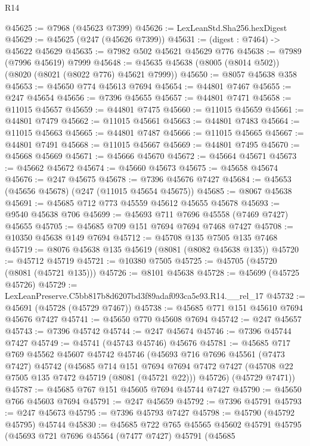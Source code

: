 \begin{lexlean}{R14}
\begin{coremodule}
@45625 := @7968 (@45623 @7399)
@45626 := LexLeanStd.Sha256.hexDigest
@45629 := @45625 (@247 (@45626 @7399))
@45631 := (digest : @7464) -> @45622 @45629
@45635 := @7982 @502 @45621 @45629 @776
@45638 := @7989 (@7996 @45619) @7999
@45648 := @45635 @45638 (@8005 (@8014 @502)) (@8020 (@8021 (@8022 @776) @45621 @7999))
@45650 := @8057 @45638 @358
@45653 := @45650 @774 @45613 @7694
@45654 := @44801 @7467
@45655 := @247 @45654
@45656 := @7396 @45655
@45657 := @44801 @7471
@45658 := @11015 @45657
@45659 := @44801 @7475
@45660 := @11015 @45659
@45661 := @44801 @7479
@45662 := @11015 @45661
@45663 := @44801 @7483
@45664 := @11015 @45663
@45665 := @44801 @7487
@45666 := @11015 @45665
@45667 := @44801 @7491
@45668 := @11015 @45667
@45669 := @44801 @7495
@45670 := @45668 @45669
@45671 := @45666 @45670
@45672 := @45664 @45671
@45673 := @45662 @45672
@45674 := @45660 @45673
@45675 := @45658 @45674
@45676 := @247 @45675
@45678 := @7396 @45676 @7427
@45684 := @45653 (@45656 @45678) (@247 (@11015 @45654 @45675))
@45685 := @8067 @45638
@45691 := @45685 @712 @773 @45559 @45612 @45655 @45678
@45693 := @9540 @45638 @706
@45699 := @45693 @711 @7696 @45558 (@7469 @7427) @45655
@45705 := @45685 @709 @151 @7694 @7694 @7468 @7427
@45708 := @10350 @45638 @149 @7694
@45712 := @45708 @135 @7505 @135 @7468
@45719 := @8076 @45638 @135 @45619 (@8081 (@8082 @45638 @135))
@45720 := @45712 @45719
@45721 := @10380 @7505
@45725 := @45705 (@45720 (@8081 (@45721 @135)))
@45726 := @8101 @45638
@45728 := @45699 (@45725 @45726)
@45729 := LexLeanPreserve.C5bb817b8d6207bd3f89adaf093ca5e93.R14.__rel_17
@45732 := @45691 (@45728 (@45729 @7467))
@45738 := @45685 @771 @151 @45610 @7694 @45676 @7427
@45741 := @45650 @770 @45608 @7694
@45742 := @247 @45657
@45743 := @7396 @45742
@45744 := @247 @45674
@45746 := @7396 @45744 @7427
@45749 := @45741 (@45743 @45746) @45676
@45781 := @45685
    @717
    @769
    @45562
    @45607
    @45742
    @45746
    (@45693
      @716
      @7696
      @45561
      (@7473 @7427)
      @45742
      (@45685
        @714
        @151
        @7694
        @7694
        @7472
        @7427
        (@45708 @22 @7505 @135 @7472 @45719 (@8081 (@45721 @22)))
        @45726)
      (@45729 @7471))
@45787 := @45685 @767 @151 @45605 @7694 @45744 @7427
@45790 := @45650 @766 @45603 @7694
@45791 := @247 @45659
@45792 := @7396 @45791
@45793 := @247 @45673
@45795 := @7396 @45793 @7427
@45798 := @45790 (@45792 @45795) @45744
@45830 := @45685
    @722
    @765
    @45565
    @45602
    @45791
    @45795
    (@45693
      @721
      @7696
      @45564
      (@7477 @7427)
      @45791
      (@45685

\end{coremodule}
\end{lexlean}
